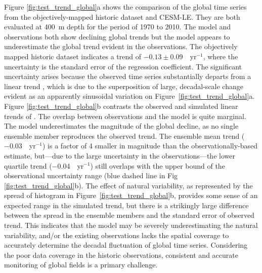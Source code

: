 \documentclass{report_chapter}
\begin{document}
Figure \ref{fig:test_trend_global}a shows the comparison of the global \OO{} time series from the objectively-mapped historic \OO{} dataset \citep{Ito-Minobe-etal-2017} and CESM-LE.
They are both evaluated at 400~m depth for the period of 1970 to 2010.
The model and observations both show declining global \OO{} trends but the model appears to underestimate the global \OO{} trend evident in the observations.
The objectively mapped historic \OO{} dataset indicates a trend of $-0.13\pm0.09$~\mmolmmm{}~yr$^{-1}$, where the uncertainty is the standard error of the regression coefficient.
The significant uncertainty arises because the observed time series substantially departs from a linear trend \citep{Santer-Mears-etal-2011}, which is due to the superposition of large, decadal-scale change evident as an apparently sinusoidal variation on Figure~\ref{fig:test_trend_global}a.
Figure \ref{fig:test_trend_global}b contrasts the observed and simulated linear trends of \OO{}.
The overlap between observations and the model is quite marginal.
The model underestimates the magnitude of the global \OO{} decline, as no single ensemble member reproduces the observed trend.
The ensemble mean trend ($-0.03$~\mmolmmm{}~yr$^{-1}$) is a factor of 4 smaller in magnitude than the observationally-based estimate, but---due to the large uncertainty in the observations---the lower quartile trend ($-$0.04~\mmolmmm{}~yr$^{-1}$) still overlaps with the upper bound of the observational uncertainty range (blue dashed line in Fig \ref{fig:test_trend_global}b).
The effect of natural variability, as represented by the spread of histogram in Figure~\ref{fig:test_trend_global}b, provides some sense of an expected range in the simulated trend, but there is a strikingly large difference between the spread in the ensemble members and the standard error of observed trend.
This indicates that the model may be severely underestimating the natural variability, and/or the existing observations lacks the spatial coverage to accurately determine the decadal fluctuation of global \OO{} time series.
Considering the poor data coverage in the historic observations, consistent and accurate monitoring of global \OO{} fields is a primary challenge.
\end{document}
